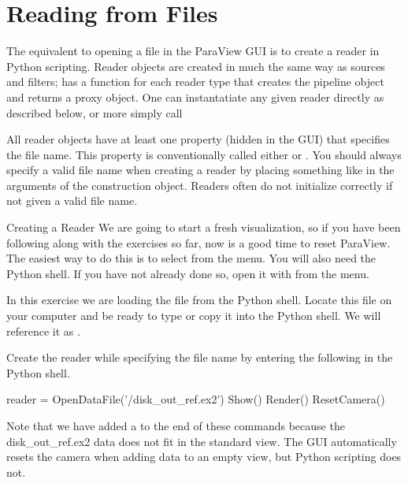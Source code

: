 \section{Reading from Files}
\label{sec:ReadingFromFiles}

The equivalent to opening a file in the ParaView GUI is to create a reader
in Python scripting.  Reader objects are created in much the same way as
sources and filters;  has a function for each
reader type that creates the pipeline object and returns a
proxy object. One can instantatiate any given reader
directly as described below, or more simply call 

All reader objects have at least one property (hidden in the GUI) that
specifies the file name.  This property is conventionally called either
 or .  You should always specify a valid
file name when creating a reader by placing something like
 in the arguments of the construction
object.  Readers often do not initialize correctly if not given a valid
file name.

\begin{exercise}{Creating a Reader}
  \label{ex:CreatingAReader}%
  We are going to start a fresh visualization, so if you have been
  following along with the exercises so far, now is a good time to reset
  ParaView.  The easiest way to do this is to select  \ra
   from the menu.  You will also need the Python shell.
  If you have not already done so, open it with  \ra {} from the menu.

  In this exercise we are loading the  file from
  the Python shell.  Locate this file on your computer and be ready to type
  or copy it into the Python shell.  We will reference it as
  .

  Create the reader while specifying the file name by entering the following
  in the Python shell.

  \begin{pythonpluscommands}
reader = OpenDataFile('/disk_out_ref.ex2')
Show()
Render()
ResetCamera()
  \end{pythonpluscommands}

  Note that we have added a  to the end of these
  commands because the disk\_out\_ref.ex2 data does not fit in the standard
  view. The GUI automatically resets the camera when adding data to an
  empty view, but Python scripting does not.
\end{exercise}


